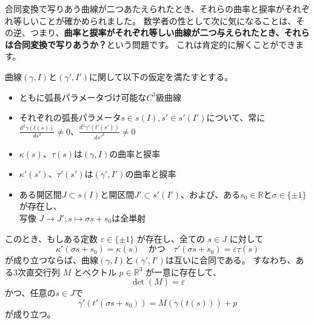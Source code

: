 合同変換で写りあう曲線が二つあたえられたとき、それらの曲率と捩率がそれぞれ等しいことが確かめられました。
数学者の性として次に気になることは、その逆、つまり、\textbf{曲率と捩率がそれぞれ等しい曲線が二つ与えられたとき、それらは合同変換で写りあうか？}という問題です。
これは肯定的に解くことができます。
\begin{theorem}
  曲線$(\gamma,I)$と$(\gamma',I')$に関して以下の仮定を満たすとする。
  \begin{itemize}
    \item ともに弧長パラメータづけ可能な$C^3$級曲線
    \item それぞれの弧長パラメータ$s\in s(I),s'\in s'(I')$について、常に$\frac{d^2\gamma(t(s))}{ds^2}\neq0$、$\frac{d^2\gamma'(t'(s'))}{ds'^2}\neq0$
    \item $\kappa(s)$、$\tau(s)$は$(\gamma,I)$の曲率と捩率
    \item $\kappa'(s')$、$\tau'(s')$は$(\gamma',I')$の曲率と捩率
    \item ある開区間$J\subset s(I)$と開区間$J'\subset s'(I')$、および、ある$s_0\in\mathbb{R}と\sigma\in\{\pm1\}$が存在し、\\
    写像 $J\to J';s\mapsto \sigma s+s_0$は全単射
  \end{itemize}
  このとき、もしある定数 $\varepsilon\in\{±1\}$ が存在し、全ての $s\in J$ に対して
  \[
    \kappa'(\sigma s+s_0) = \kappa(s) \quad \text{かつ} \quad \tau'(\sigma s+s_0) = \varepsilon \tau(s)
  \]
  が成り立つならば、曲線$(\gamma,I)$と$(\gamma',I')$は互いに合同である。
  すなわち、ある3次直交行列 $M$ とベクトル $p\in\mathbb{R}^3$ が一意に存在して、
  \[
    \det(M) = \varepsilon
  \]
  かつ、任意の$s\in J$で
  \[
    \gamma'(t'(\sigma s+s_0)) = M(\gamma(t(s))) + p
  \]
  が成り立つ。
\end{theorem}

